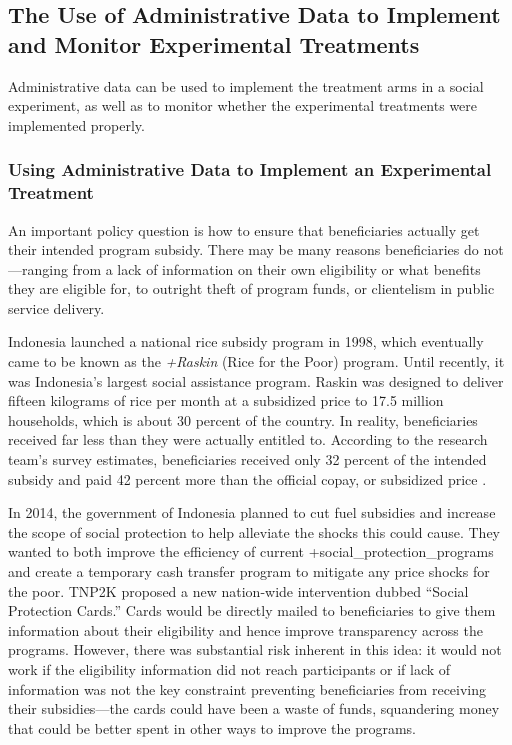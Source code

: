 \documentclass[
]{WileySix}
\begin{document}
\hypertarget{the-use-of-administrative-data-to-implement-and-monitor-experimental-treatments}{%
\subsection{The Use of Administrative Data to Implement and Monitor Experimental Treatments}\label{the-use-of-administrative-data-to-implement-and-monitor-experimental-treatments}}

Administrative data can be used to implement the treatment arms in a social experiment, as well as to monitor whether the experimental treatments were implemented properly.

\hypertarget{using-administrative-data-to-implement-an-experimental-treatment}{%
\subsubsection{Using Administrative Data to Implement an Experimental Treatment}\label{using-administrative-data-to-implement-an-experimental-treatment}}

An important policy question is how to ensure that beneficiaries actually get their intended program subsidy. There may be many reasons beneficiaries do not---ranging from a lack of information on their own eligibility or what benefits they are eligible for, to outright theft of program funds, or clientelism in public service delivery.

Indonesia launched a national rice subsidy program in 1998, which eventually came to be known as the \emph{+Raskin\textbar{}} (Rice for the Poor) program. Until recently, it was Indonesia's largest social assistance program. Raskin was designed to deliver fifteen kilograms of rice per month at a subsidized price to 17.5 million households, which is about 30 percent of the country. In reality, beneficiaries received far less than they were actually entitled to. According to the research team's survey estimates, beneficiaries received only 32 percent of the intended subsidy and paid 42 percent more than the official copay, or subsidized price \citep{banerjee2018}.

In 2014, the government of Indonesia planned to cut fuel subsidies and increase the scope of social protection to help alleviate the shocks this could cause. They wanted to both improve the efficiency of current +social\_protection\_programs\textbar{} and create a temporary cash transfer program to mitigate any price shocks for the poor. TNP2K proposed a new nation-wide intervention dubbed ``Social Protection Cards.'' Cards would be directly mailed to beneficiaries to give them information about their eligibility and hence improve transparency across the programs. However, there was substantial risk inherent in this idea: it would not work if the eligibility information did not reach participants or if lack of information was not the key constraint preventing beneficiaries from receiving their subsidies---the cards could have been a waste of funds, squandering money that could be better spent in other ways to improve the programs.
\end{document}
